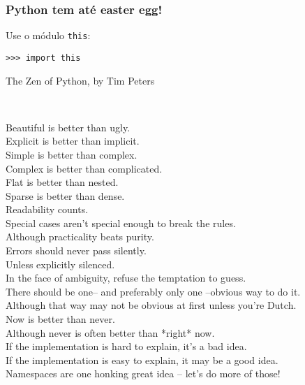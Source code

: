 \documentclass{beamer}
\begin{document}
\begin{frame}[containsverbatim]
\frametitle{Python tem até easter egg!}
  \begin{scriptsize}
    Use o módulo \texttt{this}:
  \end{scriptsize}
  \begin{lstlisting}
>>> import this
  \end{lstlisting}
  \begin{scriptsize}
    The Zen of Python, by Tim Peters
  \end{scriptsize}\\
  \begin{tiny}
    Beautiful is better than ugly.\\
    Explicit is better than implicit.\\
    Simple is better than complex.\\
    Complex is better than complicated.\\
    Flat is better than nested.\\
    Sparse is better than dense.\\
    Readability counts.\\
    Special cases aren't special enough to break the rules.\\
    Although practicality beats purity.\\
    Errors should never pass silently.\\
    Unless explicitly silenced.\\
    In the face of ambiguity, refuse the temptation to guess.\\
    There should be one-- and preferably only one --obvious way to do it.\\
    Although that way may not be obvious at first unless you're Dutch.\\
    Now is better than never.\\
    Although never is often better than *right* now.\\
    If the implementation is hard to explain, it's a bad idea.\\
    If the implementation is easy to explain, it may be a good idea.\\
    Namespaces are one honking great idea -- let's do more of those!\\
  \end{tiny}
\end{frame}
\end{document}
